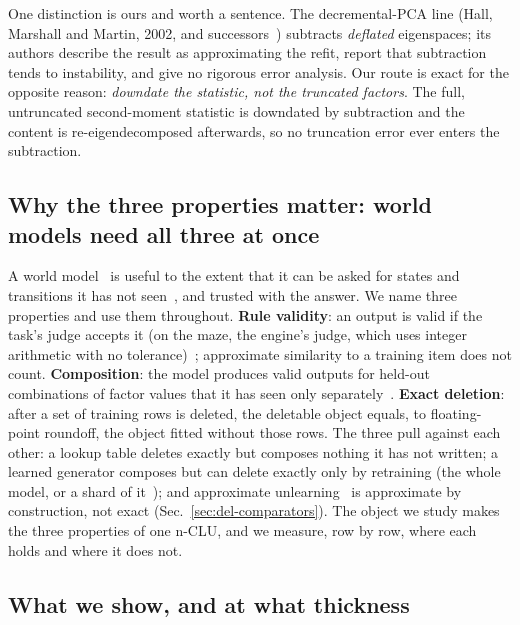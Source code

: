 \documentclass{article} %
\begin{document}
One distinction is ours and worth a sentence. The decremental-PCA line
(Hall, Marshall and Martin, 2002\nocite{hall2002adding}, and successors~\citep{jin2014evd,lee2021fast}) subtracts \emph{deflated} eigenspaces; its
authors describe the result as approximating the refit, report that subtraction tends to
instability, and give no rigorous error analysis. Our route is exact for the opposite reason:
\emph{downdate the statistic, not the truncated factors}. The full, untruncated second-moment
statistic is downdated by subtraction and the content is re-eigendecomposed afterwards, so no
truncation error ever enters the subtraction.

\subsection{Why the three properties matter: world models need all three at once}
\label{sec:why}

A world model~\citep{ha2018world,hafner2025mastering} is useful to the extent that it can be asked for states and transitions it
has not seen~\citep{valevski2025diffusion}, and trusted with the answer. We name three properties and use them throughout.
\textbf{Rule validity}: an output is valid if the task's judge accepts it (on the maze, the engine's judge, which uses
integer arithmetic with no tolerance)~\citep{vafa2024evaluating}; approximate similarity to a training item does not count.
\textbf{Composition}: the model produces valid outputs for held-out combinations of factor
values that it has seen only separately~\citep{zhao2022toward}. \textbf{Exact deletion}: after a set of training rows
is deleted, the deletable object equals, to floating-point roundoff, the object fitted without
those rows. The three pull against each other: a lookup table deletes exactly but composes
nothing it has not written; a learned generator composes but can delete exactly only by retraining
(the whole model, or a shard of it~\citep{bourtoule2021machine}); and
approximate unlearning~\citep{guo2020certified,golatkar2020eternal} is approximate by construction, not exact (Sec.~\ref{sec:del-comparators}).
The object we study makes the three properties of one n-CLU, and we measure, row by row, where each
holds and where it does not.

\subsection{What we show, and at what thickness}
\label{sec:contrib}
\end{document}
